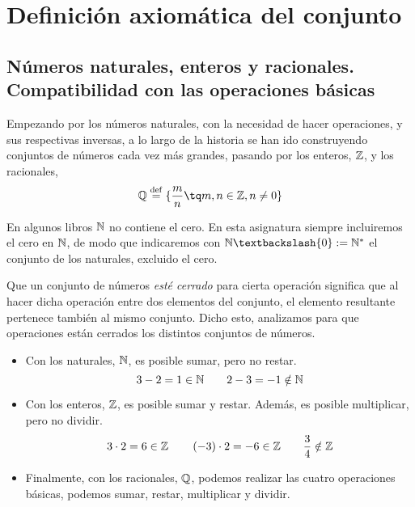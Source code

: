 \chapter{Definición axiomática del conjunto \R}
\section{Números naturales, enteros y racionales. Compatibilidad con las operaciones básicas}
Empezando por los números naturales, con la necesidad de hacer operaciones, y sus respectivas inversas, a lo largo de la historia se han ido construyendo conjuntos de números cada vez más grandes, pasando por los enteros, $\mathbb{Z}$, y los racionales,
\begin{equation}
    \Q \bydef \lbrace \frac{m}{n}\tq m, n\in\Z, n\neq 0 \rbrace
\end{equation}

\begin{remark}
    En algunos libros $\mathbb{N}$ no contiene el cero. En esta asignatura siempre incluiremos el cero en $\mathbb{N}$, de modo que indicaremos con $\N\textbackslash \{0\}:=\N^* $ el conjunto de los naturales, excluido el cero.
\end{remark}

Que un conjunto de números \textit{esté cerrado} para cierta operación significa que al hacer dicha operación entre dos elementos del conjunto, el elemento resultante pertenece también al mismo conjunto. Dicho esto, analizamos para que operaciones están cerrados los distintos conjuntos de números.
\begin{itemize}[itemsep = -2pt]
    \item Con los naturales, $\mathbb{N}$, es posible sumar, pero no restar.
        \begin{equation}
            3-2 = 1\in\mathbb{N}\quad\quad 2 - 3 = -1 \notin\mathbb{N}
        \end{equation}
    \item Con los enteros, $\mathbb{Z}$, es posible sumar y restar. Además, es posible multiplicar, pero no dividir.
        \begin{equation}
            3\cdot 2 = 6\in\mathbb{Z}\quad\quad \left( -3 \right)\cdot 2 = -6\in\mathbb{Z} \quad\quad \frac{3}{4}\notin\mathbb{Z}
        \end{equation}
    \item Finalmente, con los racionales, $\mathbb{Q}$, podemos realizar las cuatro operaciones básicas, podemos sumar, restar, multiplicar y dividir.
\end{itemize}


